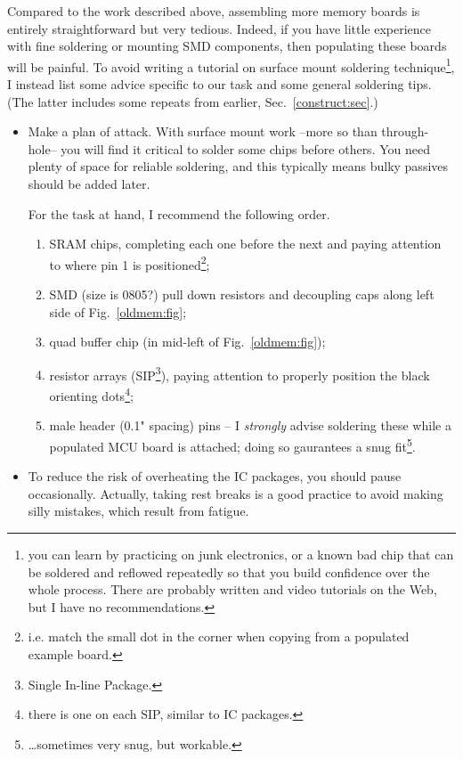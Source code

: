 \documentclass[letterpaper]{article}
\begin{document}
Compared to the work described above, assembling more memory boards is
entirely straightforward but very tedious. Indeed, if you have little
experience with fine soldering or mounting SMD components, then
populating these boards will be painful. To avoid writing a tutorial
on surface mount soldering technique\footnote{you can learn by
  practicing on junk electronics, or a known bad chip that can be
  soldered and reflowed repeatedly so that you build confidence over
  the whole process. There are probably written and video tutorials on
  the Web, but I have no recommendations.}, I instead list some advice
specific to our task and some general soldering tips. (The latter
includes some repeats from earlier, Sec.~\ref{construct:sec}.)
\begin{itemize}
\item Make a plan of attack. With surface mount work --more so than
  through-hole-- you will find it critical to solder some chips
  before others. You need plenty of space for reliable soldering, and
  this typically means bulky passives should be added later.

For the task at hand, I recommend the following order.
\begin{enumerate}
\item SRAM chips, completing each one before the next and paying
  attention to where pin 1 is positioned\footnote{i.e. match the small
    dot in the corner when copying from a populated example board.};

\item SMD (size is 0805?) pull down resistors and decoupling caps
  along left side of Fig.~\ref{oldmem:fig};

\item quad buffer chip (in mid-left of Fig.~\ref{oldmem:fig});

\item resistor arrays (SIP\footnote{Single In-line Package.}), paying
  attention to properly position the black orienting
  dots\footnote{there is one on each SIP, similar to IC packages.};

\item male header (0.1" spacing) pins -- I \textit{strongly} advise
  soldering these while a populated MCU board is attached; doing so
  gaurantees a snug fit\footnote{\ldots{}sometimes very snug, but
    workable.}.
\end{enumerate}

\item To reduce the risk of overheating the IC packages, you should
  pause occasionally. Actually, taking rest breaks is a good practice
  to avoid making silly mistakes, which result from fatigue.


\end{itemize}
\end{document}
